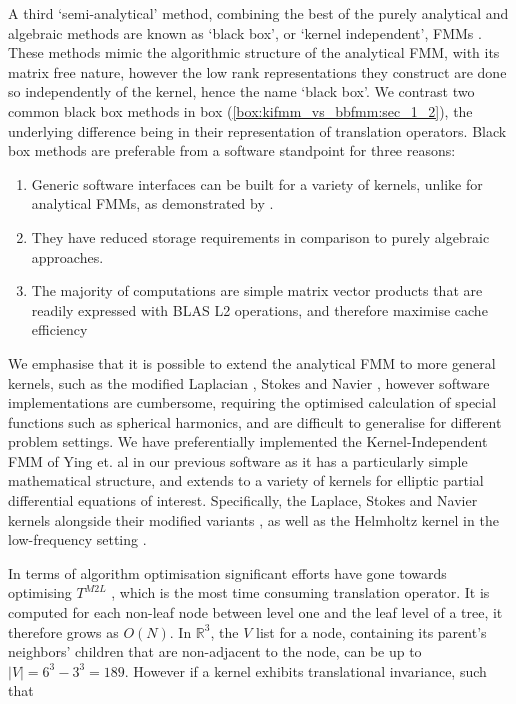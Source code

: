 A third `semi-analytical' method, combining the best of the purely analytical and algebraic methods are known as `black box', or `kernel independent', FMMs \cite{Ying:2004:JCP,fong2009black,martinsson2007accelerated}. These methods mimic the algorithmic structure of the analytical FMM, with its matrix free nature, however the low rank representations they construct are done so independently of the kernel, hence the name `black box'. We contrast two common black box methods in box (\ref{box:kifmm_vs_bbfmm:sec_1_2}), the underlying difference being in their representation of translation operators. Black box methods are preferable from a software standpoint for three reasons:

\begin{enumerate}
    \item Generic software interfaces can be built for a variety of kernels, unlike for analytical FMMs, as demonstrated by \cite{wang2021exafmm,kailasa2022pyexafmm}.
    \item They have reduced storage requirements in comparison to purely algebraic approaches.
    \item The majority of computations are simple matrix vector products that are readily expressed with BLAS L2 operations, and therefore maximise cache efficiency
\end{enumerate}

We emphasise that it is possible to extend the analytical FMM to more general kernels, such as the modified Laplacian \cite{greengard2002new}, Stokes \cite{fu2000fast} and Navier \cite{fu1998fast}, however software implementations are cumbersome, requiring the optimised calculation of special functions such as spherical harmonics, and are difficult to generalise for different problem settings. We have preferentially implemented the Kernel-Independent FMM of Ying et. al \cite{Ying:2004:JCP} in our previous software \cite{kailasa2022pyexafmm} as it has a particularly simple mathematical structure, and extends to a variety of kernels for elliptic partial differential equations of interest. Specifically, the Laplace, Stokes and Navier kernels alongside their modified variants \cite{Ying:2004:JCP}, as well as the Helmholtz kernel in the low-frequency setting \cite{wang2021exafmm}. 

In terms of algorithm optimisation significant efforts have gone towards optimising $T^{M2L}$ \cite{messner2012optimized,fong2009black,Ying:2004:JCP}, which is the most time consuming translation operator. It is computed for each non-leaf node between level one and the leaf level of a tree, it therefore grows as $O(N)$. In $\mathbb{R}^3$, the $V$ list for a node, containing its parent’s neighbors' children that are non-adjacent to the node, can be up to $|V| = 6^3 - 3^3=189$. However if a kernel exhibits translational invariance, such that

